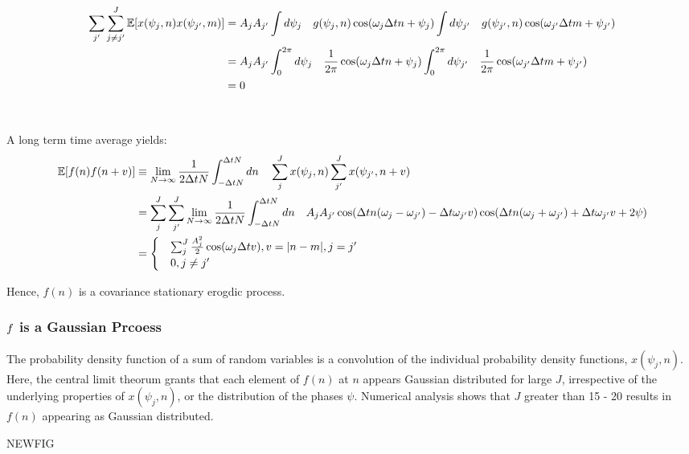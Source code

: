 \begin{align}
\sum_{j'}\sum_{j\neq j'}^J \mathbb{E}[x(\psi_j, n) x(\psi_{j'}, m)] & = A_j A_{j'} \int d \psi_j \quad g(\psi_j, n) \cos(\omega_j \Delta t n + \psi_j) \int d \psi_{j'} \quad g(\psi_{j'}, n) \cos(\omega_{j'} \Delta t m + \psi_{j'}) \\
& = A_j A_{j'} \int_0^{2\pi} d \psi_j \quad \frac{1}{2\pi} \cos(\omega_j \Delta t n + \psi_j) \int_0^{2\pi} d \psi_{j'} \quad \frac{1}{2\pi}  \cos(\omega_{j'} \Delta t m + \psi_{j'}) \\
& = 0 
\end{align}
 \\
 \\
  A long term time average yields:
\begin{align}
\mathbb{E}[f(n)f(n + v)] & \equiv \lim_{N \to \infty} \frac{1}{2 \Delta t N} \int_{-\Delta t N}^{\Delta t N} dn \quad  \sum_j^J x(\psi_j, n) \sum_{j'}^{J} x(\psi_{j'}, n + v) \\
&= \sum_j^J  \sum_{j'}^{J} \lim_{N \to \infty} \frac{1}{2 \Delta t N} \int_{-\Delta t N}^{\Delta t N} dn \quad   A_j A_{j'} \cos (\Delta t n(\omega_j - \omega_{j'}) - \Delta t \omega_{j'} v)  \cos (\Delta t n(\omega_j + \omega_{j'}) + \Delta t \omega_{j'} v + 2\psi)\\
&= \begin{cases}
& \sum_j^J \frac{A_j^2}{2} \cos(\omega_j \Delta t v), v = |n - m |, j = j' \\
& 0, j \neq j'
\end{cases}
\end{align}

Hence, $f(n)$ is a covariance stationary erogdic process.

\subsubsection{$f$ is a Gaussian Prcoess}

The probability density function of a sum of random variables is a convolution of the individual probability density functions,   $x(\psi_j, n)$. Here, the central limit theorum grants that each element of $f(n)$ at $n$ appears Gaussian distributed for large $J$, irrespective of the underlying properties of $x(\psi_j, n)$, or the distribution of the phases $\psi$. Numerical analysis shows that $J$ greater than 15 - 20 results in $f(n)$ appearing as Gaussian distributed. 

NEWFIG

